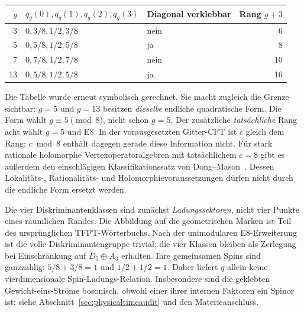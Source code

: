 \begin{center}
\begin{tabular}{rllr}
\toprule
$g$ & $q_g(0),q_g(1),q_g(2),q_g(3)$ & Diagonal verklebbar & Rang $g+3$\\\midrule
3 & $0,3/8,1/2,3/8$ & nein & 6\\
5 & $0,5/8,1/2,5/8$ & ja & 8\\
7 & $0,7/8,1/2,7/8$ & nein & 10\\
13 & $0,5/8,1/2,5/8$ & ja & 16\\\bottomrule
\end{tabular}
\end{center}

Die Tabelle wurde erneut symbolisch gerechnet. Sie macht zugleich die Grenze sichtbar: $g=5$ und $g=13$ besitzen \emph{dieselbe} endliche quadratische Form. Die Form wählt $g\equiv5\pmod8$, nicht schon $g=5$. Der zusätzliche \emph{tatsächliche} Rang acht wählt $g=5$ und E8. In der vorausgesetzten Gitter-CFT ist $c$ gleich dem Rang; $c\bmod8$ enthält dagegen gerade diese Information nicht. Für stark rationale holomorphe Vertexoperatoralgebren mit tatsächlichem $c=8$ gibt es außerdem den einschlägigen Klassifikationssatz von Dong--Mason~\cite{dongmasonlow}. Dessen Lokalitäts-, Rationalitäts- und Holomorphievoraussetzungen dürfen nicht durch die endliche Form ersetzt werden.

Die vier Diskriminantenklassen sind zunächst \emph{Ladungssektoren}, nicht vier Punkte eines räumlichen Randes. Die Abbildung auf die geometrischen Marken ist Teil des ursprünglichen TFPT-Wörterbuchs. Nach der unimodularen E8-Erweiterung ist die volle Diskriminantengruppe trivial; die vier Klassen bleiben als Zerlegung bei Einschränkung auf $D_5\oplus A_3$ erhalten. Ihre gemeinsamen Spins sind ganzzahlig: $5/8+3/8=1$ und $1/2+1/2=1$. Daher liefert $q$ allein keine vierdimensionale Spin-Ladungs-Relation. Insbesondere sind die geklebten Gewicht-eins-Ströme bosonisch, obwohl einer ihrer internen Faktoren ein Spinor ist; siehe Abschnitt~\ref{sec:physicaltimeaudit} und den Materieanschluss.

